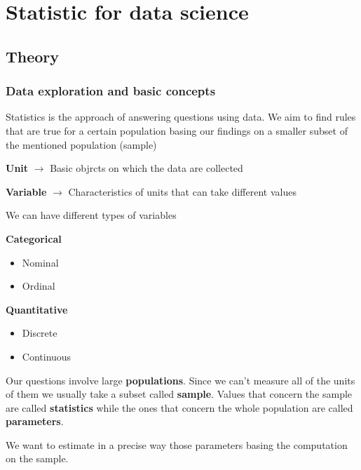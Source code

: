 \section{Statistic for data science}

\subsection{Theory}

\subsubsection{Data exploration and basic concepts}

Statistics is the approach of answering questions using data. We aim to find rules that are true for a certain population basing our findings on a smaller subset of the mentioned population (sample)

\vspace{10pt}

\textbf{Unit} $\xrightarrow{}$ Basic objrcts on which the data are collected

\textbf{Variable} $\xrightarrow{}$ Characteristics of units that can take different values

\vspace{10pt}

We can have different types of variables
\vspace{10pt}

\textbf{Categorical}
\begin{itemize}
    \item Nominal
    \item Ordinal
\end{itemize}

\textbf{Quantitative}
\begin{itemize}
    \item Discrete
    \item Continuous
\end{itemize}

Our questions involve large \textbf{populations}. Since we can't measure all of the units of them we usually take a subset called \textbf{sample}. Values that concern the sample are called \textbf{statistics} while the ones that concern the whole population are called \textbf{parameters}. 

\vspace{10pt}

We want to estimate in a precise way those parameters basing the computation on the sample.

